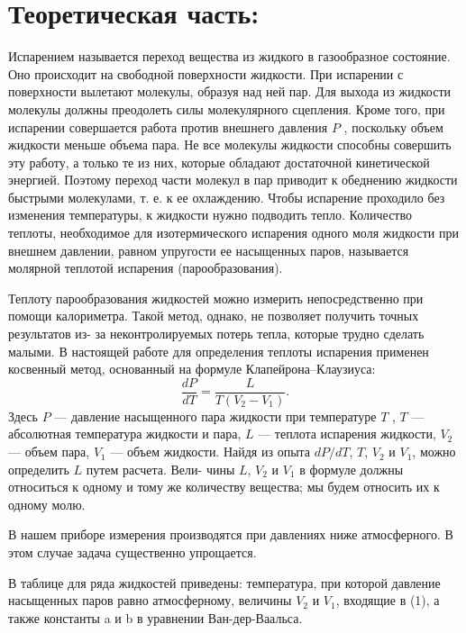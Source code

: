 \documentclass[20pt]{article}
\begin{document}
\section{Теоретическая часть:}
Испарением называется переход вещества из жидкого в газообразное состояние. 
Оно происходит на свободной поверхности жидкости. При испарении с поверхности 
вылетают молекулы, образуя над ней пар. Для выхода из жидкости молекулы должны 
преодолеть силы молекулярного сцепления. Кроме того, при испарении совершается 
работа против внешнего давления $P$ , поскольку объем жидкости меньше объема 
пара. Не все молекулы жидкости способны совершить эту работу, а только те из 
них, которые обладают достаточной кинетической энергией. Поэтому переход части 
молекул в пар приводит к обеднению жидкости быстрыми молекулами, т. е. к ее 
охлаждению. Чтобы испарение проходило без изменения температуры, к жидкости
нужно подводить тепло. Количество теплоты, необходимое для изотермического 
испарения одного моля жидкости при внешнем давлении, равном упругости ее 
насыщенных паров, называется молярной теплотой испарения (парообразования).

Теплоту парообразования жидкостей можно измерить непосредственно при помощи 
калориметра. Такой метод, однако, не позволяет получить точных результатов из-
за неконтролируемых потерь тепла, которые трудно сделать малыми. В настоящей 
работе для определения теплоты испарения применен косвенный метод, основанный 
на формуле Клапейрона–Клаузиуса:
\begin{equation}
	\frac{dP}{dT} = \frac{L}{T(V_2-V_1)}.
\end{equation}
Здесь $P$ --- давление насыщенного пара жидкости при температуре
$T$ , $T$ --- абсолютная температура жидкости и пара, $L$ --- теплота испарения жидкости, $V_2$ --- объем пара, $V_1$ --- объем жидкости. Найдя из
опыта $dP/dT$, $T$, $V_2$ и $V_1$, можно определить $L$ путем расчета. Вели-
чины $L$, $V_2$ и $V_1$ в формуле  должны относиться к одному и тому
же количеству вещества; мы будем относить их к одному молю.

В нашем приборе измерения производятся при давлениях ниже
атмосферного. В этом случае задача существенно упрощается.

В таблице для ряда жидкостей приведены: температура, при которой давление насыщенных паров равно атмосферному, величины $V_2$ и $V_1$, входящие в (1), а также константы a и b в уравнении Ван-дер-Ваальса.
\end{document}

